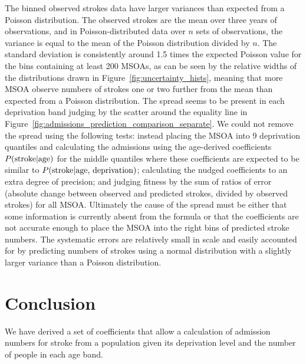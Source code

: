 \documentclass[12pt]{extarticle}
\begin{document}
The binned observed strokes data have larger variances than expected from a Poisson distribution.
The observed strokes are the mean over three years of observations, and in Poisson-distributed data over $n$ sets of observations, the variance is equal to the mean of the Poisson distribution divided by $n$. 
The standard deviation is consistently around 1.5 times the expected Poisson value for the bins containing at least 200 MSOAs, as can be seen by the relative widths of the distributions drawn in Figure~\ref{fig:uncertainty_hists}, meaning that more MSOA observe numbers of strokes one or two further from the mean than expected from a Poisson distribution.
%
The spread seems to be present in each deprivation band judging by the scatter around the equality line in Figure~\ref{fig:admissions_prediction_comparison_separate}.
% 
We could not remove the spread using the following tests: instead placing the MSOA into 9 deprivation quantiles and calculating the admissions using the age-derived coefficients $P(\textnormal{stroke} | \textnormal{age})$ for the middle quantiles where these coefficients are expected to be similar to  $P(\textnormal{stroke} | \textnormal{age, deprivation})$; calculating the nudged coefficients to an extra degree of precision; and judging fitness by the sum of ratios of error (absolute change between observed and predicted strokes, divided by observed strokes) for all MSOA.
%
Ultimately the cause of the spread must be either
that some information is currently absent from the formula or
that the coefficients are not accurate enough to place the MSOA into the right bins of predicted stroke numbers.
The systematic errors are relatively small in scale and easily accounted for by predicting numbers of strokes using a normal distribution with a slightly larger variance than a Poisson distribution.


\section{Conclusion}

We have derived a set of coefficients that allow a calculation of admission numbers for stroke from a population given its deprivation level and the number of people in each age band.



\end{document}

